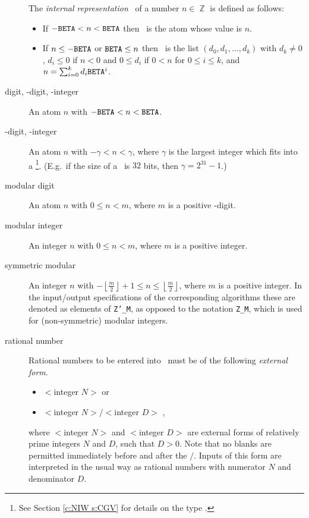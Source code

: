 \begin{description}
  The {\em internal representation} \ttI\ of a number $n \in \BbbZ$ is defined as
  follows:
  \begin{itemize}
  \item
    If $-{\tt BETA} < n < {\tt BETA}$ then \ttI\ is the atom whose value is $n$.
  \item
    If $n \leq -{\tt BETA}$ or ${\tt BETA} \leq n$ then \ttI\ is the list
    $(d_0,d_1,\ldots,d_k)$ with $d_k \neq 0$, $d_i \leq 0$ if $n < 0$ and
    $0 \leq d_i$ if $0 < n$ for $0 \leq i \leq k$, and $n = \sum_{i=0}^k
    d_i {\tt BETA}^i$.
  \end{itemize}
\item[digit, \BETA-digit, \BETA-integer]
  An atom $n$ with $-{\tt BETA} < n < {\tt BETA}$.
\item[\GAMMA-digit, \GAMMA-integer]
  An atom $n$ with $-\gamma < n < \gamma$, where $\gamma$ is the largest
  integer which fits into a \Word\footnote{
    See Section \ref{c:NIW s:CGV} for details on the type \Word.
  }. (E.g.\ if the size of a \Word\ is $32$ bits, then $\gamma =
  2^{31}-1$.)
\item[modular digit]
  An atom $n$ with $0 \leq n < m$, where $m$ is a positive \BETA-digit.
\item[modular integer]
  An integer $n$ with $0 \leq n < m$, where $m$ is a positive integer.
\item[symmetric modular]
  An integer $n$ with $-\left\lfloor\frac{m}{2}\right\rfloor+1 \leq n \leq
  \left\lfloor\frac{m}{2}\right\rfloor$, where $m$ is a positive integer. In
  the input/output specifications of the corresponding algorithms these are
  denoted as elements of {\tt Z'\_M}, as opposed to the notation {\tt Z\_M},
  which is used for (non-symmetric) modular integers.
\item[rational number]
  Rational numbers to be entered into \saclib\ must be of the following
  {\em external form}.
  \begin{itemize}
  \item $<$integer $N>$ or
  \item $<$integer $N>/<$integer $D>$ ,
  \end{itemize}
  where $<$integer $N>$ and $<$integer $D>$ are external forms of relatively prime
  integers $N$ and $D$, such that $D > 0$.
  Note that no blanks are permitted immediately before and after the $/$.
  Inputs of this form are interpreted in the usual way as rational numbers
  with numerator $N$ and denominator $D$.


\end{description}

